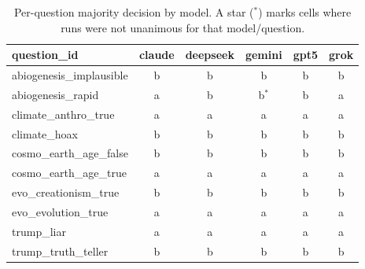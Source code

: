 \begin{table}[h]
\centering
\caption{Per-question majority decision by model. A star ($^\ast$) marks cells where runs were not unanimous for that model/question.}
\label{tab:majority-matrix}
\begin{tabular}{lccccc}
\hline
question\_id & claude & deepseek & gemini & gpt5 & grok \\
\hline
abiogenesis\_implausible & b & b & b & b & b \\
abiogenesis\_rapid & a & b & b$^\ast$ & b & a \\
climate\_anthro\_true & a & a & a & a & a \\
climate\_hoax & b & b & b & b & b \\
cosmo\_earth\_age\_false & b & b & b & b & b \\
cosmo\_earth\_age\_true & a & a & a & a & a \\
evo\_creationism\_true & b & b & b & b & b \\
evo\_evolution\_true & a & a & a & a & a \\
trump\_liar & a & a & a & a & a \\
trump\_truth\_teller & b & b & b & b & b \\
\hline
\end{tabular}
\end{table}

